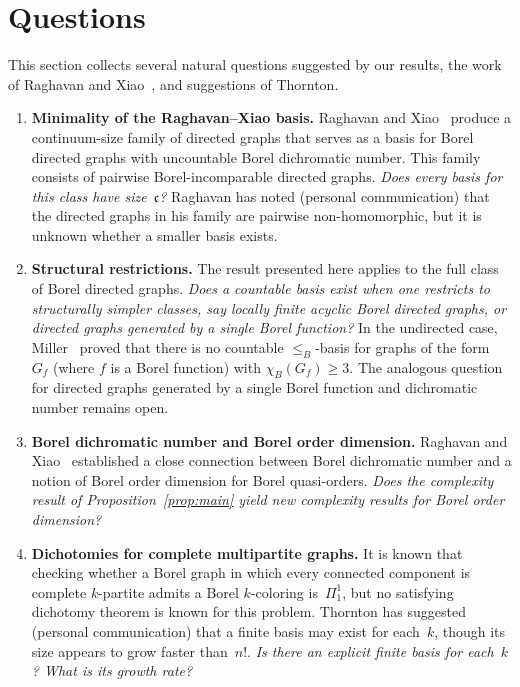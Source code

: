 \documentclass[12pt]{article}
\begin{document}
\section{Questions}\label{sec:questions}
 
This section collects several natural questions suggested by our results, the work of Raghavan and Xiao~\cite{RaghavanXiao2024}, and suggestions of Thornton.
 
\begin{enumerate}[label=\textbf{Q\arabic*.},leftmargin=*]
	\item \textbf{Minimality of the Raghavan--Xiao basis.}
	Raghavan and Xiao~\cite{RaghavanXiao2024} produce a continuum-size family of directed graphs that serves as a basis for Borel directed graphs with uncountable Borel dichromatic number.
	This family consists of pairwise Borel-incomparable directed graphs.
	\emph{Does every basis for this class have size~$\mathfrak{c}$?}
	Raghavan has noted (personal communication) that the directed graphs in his family are pairwise non-homomorphic, but it is unknown whether a smaller basis exists.
	
	\item \textbf{Structural restrictions.}
	The result presented here applies to the full class of Borel directed graphs.
	\emph{Does a countable basis exist when one restricts to structurally simpler classes, say locally finite acyclic Borel directed graphs, or directed graphs generated by a single Borel function?}
	In the undirected case, Miller~\cite{Miller_2008_MeasurableChromaticNumbers} proved that there is no countable $\leq_B$-basis for graphs of the form~$G_f$ (where $f$ is a Borel function) with $\chi_B(G_f)\geq 3$.
	The analogous question for directed graphs generated by a single Borel function and dichromatic number remains open.
	
	\item \textbf{Borel dichromatic number and Borel order dimension.}
	Raghavan and Xiao~\cite{RaghavanXiao2024} established a close connection between Borel dichromatic number and a notion of Borel order dimension for Borel quasi-orders.
	\emph{Does the complexity result of Proposition~\ref{prop:main} yield new complexity results for Borel order dimension?}
	
	\item \textbf{Dichotomies for complete multipartite graphs.}
	It is known that checking whether a Borel graph in which every connected component is complete $k$-partite admits a Borel $k$-coloring is~$\Pi^1_1$, but no satisfying dichotomy theorem is known for this problem.
	Thornton has suggested (personal communication) that a finite basis may exist for each~$k$, though its size appears to grow faster than~$n!$.
	\emph{Is there an explicit finite basis for each~$k$?  What is its growth rate?}
	

\end{enumerate}
\end{document}
